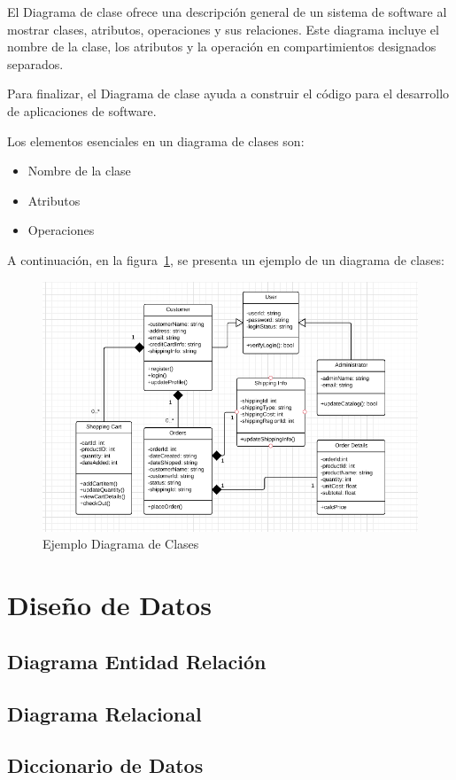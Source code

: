 El Diagrama de clase ofrece una descripción general de un sistema de software al mostrar clases, atributos, operaciones y sus relaciones. Este diagrama incluye el nombre de la clase, los atributos y la operación en compartimientos designados separados.

Para finalizar, el Diagrama de clase ayuda a construir el código para el desarrollo de aplicaciones de software.

Los elementos esenciales en un diagrama de clases son:

\begin{itemize}
    \item Nombre de la clase
    \item Atributos
    \item Operaciones
\end{itemize}

A continuación, en la figura~\ref{fig:classesDiagram}, se presenta un ejemplo de un diagrama de clases:
    \begin{figure}[H]
        \centering
        \includegraphics[width=0.7\linewidth]{imagenes/classesDiagram.png}
        \caption{Ejemplo Diagrama de Clases}
        \label{fig:classesDiagram}
    \end{figure}


\section{Diseño de Datos}\label{sc:DD}
    \subsection{Diagrama Entidad Relación}\label{ssc:ER}
    \subsection{Diagrama Relacional}\label{ssc:Rel}
    \subsection{Diccionario de Datos}\label{ssc:DD}

